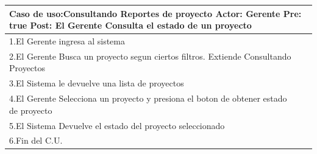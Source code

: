 \begin{longtable}{|p{}|p{}|}
    \hline
    \multicolumn{2}{|p{16cm}|}{
        \textbf{Caso de uso:}Consultando Reportes de proyecto\newline
        \textbf{Actor:} Gerente\newline
        \textbf{Pre: }true\newline
        \textbf{Post:}  El Gerente Consulta el estado de un proyecto
    }\\
    \hline
    1.El Gerente ingresa al sistema & \\
    \hline
    2.El Gerente Busca un proyecto segun ciertos filtros. Extiende Consultando Proyectos&    \\
    \hline
    3.El Sistema le devuelve una lista de proyectos& \\
    \hline
    4.El Gerente Selecciona un proyecto y presiona el boton de obtener estado de proyecto&\\
    \hline
    5.El Sistema Devuelve el estado del proyecto seleccionado &\\
    \hline
    6.Fin del C.U.&\\
    \hline
\end{longtable}

